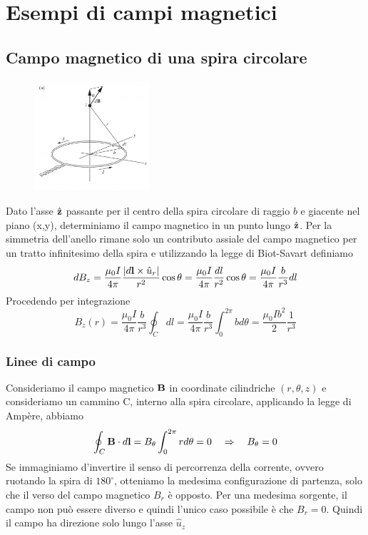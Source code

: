 \section{Esempi di campi magnetici}

\subsection{Campo magnetico di una spira circolare}
\begin{figure} %
    \centering
    \includegraphics[width=0.38\textwidth]{images/spirenew} %
\end{figure}
Dato l'asse $\hat{\bold{z}}$ passante per il centro della spira circolare di raggio $b$ e giacente nel piano (x,y), determiniamo il campo magnetico in un punto lungo $\hat{\bold{z}}$. Per la simmetria dell'anello rimane solo un contributo assiale del campo magnetico per un tratto infinitesimo della spira e utilizzando la legge di Biot-Savart definiamo 
\begin{equation*}
	dB_z = \frac{\mu_0I}{4 \pi} \frac{|d\bold{l} \times \hat{u}_{r}|}{r^2}\cos\theta   = \frac{\mu_0I}{4 \pi} \frac{dl}{r^2}\cos\theta  = \frac{\mu_0I}{4 \pi} \frac{b}{r^3}dl
\end{equation*} 
Procedendo per integrazione 
\begin{equation*}
	B_z(r) = \frac{\mu_0I}{4 \pi} \frac{b}{r^3} \oint_{C}dl = \frac{\mu_0I}{4 \pi} \frac{b}{r^3} \int_{0}^{2\pi} bd\theta = \frac{\mu_0Ib^2}{2} \frac{1}{r^3}
\end{equation*}

\subsubsection{Linee di campo }
Consideriamo il campo magnetico $\bold{B}$ in coordinate cilindriche $(r,\theta, z)$ e consideriamo un cammino C, interno alla spira circolare, applicando la legge di Amp\`ere, abbiamo
\begin{equation*}
	\oint_{C} \bold{B} \cdot d\bold{l} = B_{\theta} \int_0^{2\pi}r d\theta = 0 \quad \Rightarrow \quad B_{\theta} = 0 
\end{equation*}
Se immaginiamo d'invertire il senso di percorrenza della corrente, ovvero ruotando la spira di $180^\circ $, otteniamo la medesima configurazione di partenza, solo che il verso del campo magnetico $B_{r}$ \`e opposto. Per una medesima sorgente, il campo non pu\`o essere diverso e quindi l'unico caso possibile \`e che $B_{r} =0$. Quindi il campo ha direzione solo lungo l'asse $\hat{u}_{z}$

